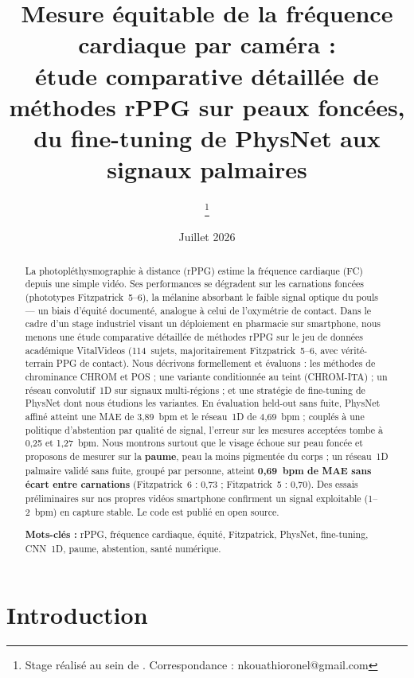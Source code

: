 \documentclass[11pt]{article}
\title{\textbf{Mesure équitable de la fréquence cardiaque par caméra :\\
étude comparative détaillée de méthodes rPPG sur peaux foncées,\\
du fine-tuning de PhysNet aux signaux palmaires}}
\author[1,2]{\Auteur\thanks{Stage réalisé au sein de \Entreprise{}. Correspondance : nkouathioronel@gmail.com}}
\affil[1]{\Entreprise{} --- développement d'outils de santé numérique}
\affil[2]{Stage d'ingénieur / de master, encadré par \Encadrant}
\date{Juillet 2026}
\begin{document}
\maketitle

\begin{abstract}
\noindent
La photopléthysmographie à distance (rPPG) estime la fréquence cardiaque (FC)
depuis une simple vidéo. Ses performances se dégradent sur les carnations foncées
(phototypes Fitzpatrick~5--6), la mélanine absorbant le faible signal optique du
pouls --- un biais d'équité documenté, analogue à celui de l'oxymétrie de contact.
Dans le cadre d'un stage industriel visant un déploiement en pharmacie sur
smartphone, nous menons une étude comparative détaillée de méthodes rPPG sur le jeu
de données académique VitalVideos (114~sujets, majoritairement Fitzpatrick~5--6,
avec vérité-terrain PPG de contact). Nous décrivons formellement et évaluons : les
méthodes de chrominance CHROM et POS ; une variante conditionnée au teint
(CHROM-ITA) ; un réseau convolutif~1D sur signaux multi-régions ; et une stratégie
de fine-tuning de PhysNet dont nous étudions les variantes. En évaluation held-out
sans fuite, PhysNet affiné atteint une MAE de 3{,}89~bpm et le réseau~1D de
4{,}69~bpm ; couplés à une politique d'abstention par qualité de signal, l'erreur
sur les mesures acceptées tombe à 0{,}25 et 1{,}27~bpm. Nous montrons surtout que le
visage échoue sur peau foncée et proposons de mesurer sur la \textbf{paume}, peau la
moins pigmentée du corps ; un réseau~1D palmaire validé sans fuite, groupé par
personne, atteint \textbf{0{,}69~bpm de MAE sans écart entre carnations}
(Fitzpatrick~6 : 0{,}73 ; Fitzpatrick~5 : 0{,}70). Des essais préliminaires sur nos
propres vidéos smartphone confirment un signal exploitable (1--2~bpm) en capture
stable. Le code est publié en open source.

\medskip
\noindent\textbf{Mots-clés :} rPPG, fréquence cardiaque, équité, Fitzpatrick,
PhysNet, fine-tuning, CNN~1D, paume, abstention, santé numérique.
\end{abstract}

\tableofcontents
\medskip

\section{Introduction}
\label{sec:intro}
\end{document}
